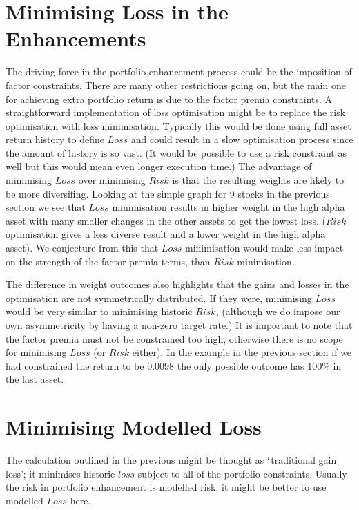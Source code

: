\documentclass[12pt]{article}
\begin{document}
\section{Minimising Loss in the Enhancements}
The driving force in the portfolio enhancement process could be the imposition
of factor constraints. There are many other restrictions going on, but the main one for 
achieving extra portfolio return is due to the factor premia constraints. A straightforward 
implementation of loss optimisation might be to replace the risk optimisation with loss minimisation.
Typically this would be done using full asset return history to define $Loss$ and could 
result in a slow optimisation process since the amount of history is so vast. (It would be possible 
to use a risk constraint as well but this would mean even longer execution time.) The advantage of
minimising $Loss$ over minimising $Risk$ is that the resulting weights are likely
to be more diversifing. Looking at the simple graph for 9 stocks in the previous section we see that
$Loss$ minimisation results in higher weight in the high alpha asset with many 
smaller changes in the other assets to get the lowest loss. ($Risk$ optimisation gives a less diverse
result and a lower weight in the high alpha asset). We conjecture from this that $Loss$ minimisation 
would make less impact on the strength of the factor premia terms, than $Risk$ minimisation. 

The difference in weight outcomes also
highlights that the gains and losses in the optimisation are not symmetrically
distributed. If they were, minimising $Loss$ would be very similar to minimising historic $Risk$, (although
we do impose our own asymmetricity by having a non-zero target rate.) It is important
to note that the factor premia must not be constrained too high, otherwise there is no scope 
for minimising $Loss$ (or $Risk$ either). In the example in the previous section 
if we had constrained the return to be $0.0098$ the only possible outcome has $100\%$ in 
the last asset.
\section{Minimising Modelled Loss}
The calculation outlined in the previous might be thought as $`$traditional gain loss'; it
minimises historic $loss$ subject to all of the portfolio constraints. Usually the risk in 
portfolio enhancement is modelled risk; it might be better to use modelled $Loss$ here.
\end{document}
